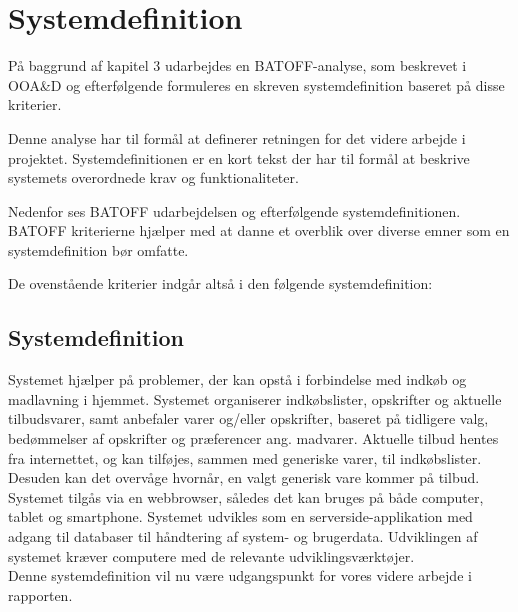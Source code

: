 \section{Systemdefinition}
På baggrund af kapitel 3 udarbejdes en BATOFF-analyse, som beskrevet i OOA\&D\citep{OOA&D2001} og efterfølgende formuleres en skreven systemdefinition baseret på disse kriterier.

Denne analyse har til formål at definerer retningen for det videre arbejde i projektet.
Systemdefinitionen er en kort tekst der har til formål at beskrive systemets overordnede krav og funktionaliteter.

Nedenfor ses BATOFF udarbejdelsen og efterfølgende systemdefinitionen.
BATOFF kriterierne hjælper med at danne et overblik over diverse emner som en systemdefinition bør omfatte.



De ovenstående kriterier indgår altså i den følgende systemdefinition:

\subsection{Systemdefinition}

Systemet hjælper på problemer, der kan opstå i forbindelse med indkøb og madlavning i hjemmet.
Systemet organiserer indkøbslister, opskrifter og aktuelle tilbudsvarer, samt anbefaler varer og/eller opskrifter, baseret på tidligere valg, bedømmelser af opskrifter og præferencer ang. madvarer.
Aktuelle tilbud hentes fra internettet, og kan tilføjes, sammen med generiske varer, til indkøbslister.
Desuden kan det overvåge hvornår, en valgt generisk vare kommer på tilbud.
Systemet tilgås via en webbrowser, således det kan bruges på både computer, tablet og smartphone.
Systemet udvikles som en serverside-applikation med adgang til databaser til håndtering af system- og brugerdata.
Udviklingen af systemet kræver computere med de relevante udviklingsværktøjer.\\

Denne systemdefinition vil nu være udgangspunkt for vores videre arbejde i rapporten.
